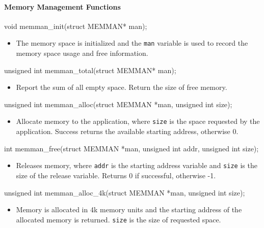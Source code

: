 \documentclass{swfcthesis}
\begin{document}
\paragraph{Memory Management Functions}

\begin{ccode}
void memman_init(struct MEMMAN* man);
\end{ccode}
\begin{itemize}
\item The memory space is initialized and the \texttt{man} variable is used to record the
  memory space usage and free information.
\end{itemize}

\begin{ccode}
unsigned int memman_total(struct MEMMAN* man);
\end{ccode}
\begin{itemize}
\item Report the sum of all empty space. Return the size of free memory.
\end{itemize}

\begin{ccode}
unsigned int memman_alloc(struct MEMMAN *man, unsigned int size);
\end{ccode}
\begin{itemize}
\item Allocate memory to the application, where \texttt{size} is the space requested by the
  application. Success returns the available starting address, otherwise 0.
\end{itemize}

\begin{ccode}
int memman_free(struct MEMMAN *man, unsigned int addr, unsigned int size);
\end{ccode}
\begin{itemize}
\item Releases memory, where \texttt{addr} is the starting address variable and
  \texttt{size} is the size of the release variable. Returns 0 if successful, otherwise
  -1.
\end{itemize}

\begin{ccode}
unsigned int memman_alloc_4k(struct MEMMAN *man, unsigned int size);
\end{ccode}
\begin{itemize}
\item Memory is allocated in 4k memory units and the starting address of the allocated
  memory is returned. \texttt{size} is the size of requested space.
\end{itemize}
\end{document}
